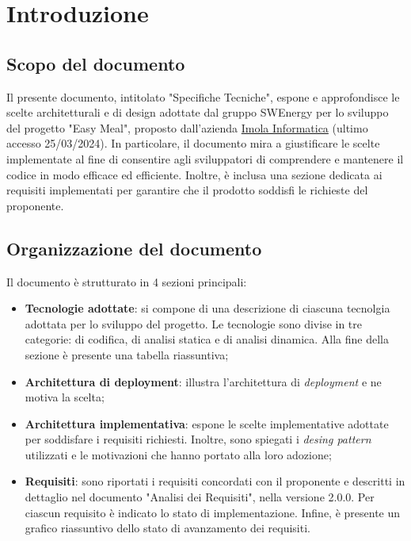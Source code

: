 \section{Introduzione}

\subsection{Scopo del documento}

Il presente documento, intitolato "Specifiche Tecniche", espone e approfondisce
le scelte architetturali e di design adottate dal gruppo SWEnergy per lo
sviluppo del progetto "Easy Meal", proposto dall'azienda \href{https://imolainformatica.it}{Imola Informatica} 
(ultimo accesso 25/03/2024). In particolare, il documento mira a giustificare le
scelte implementate al fine di consentire agli sviluppatori di comprendere e
mantenere il codice in modo efficace ed efficiente. Inoltre, è inclusa una
sezione dedicata ai requisiti implementati per garantire che il prodotto
soddisfi le richieste del proponente.

\subsection{Organizzazione del documento}

Il documento è strutturato in 4 sezioni principali:

\begin{itemize}
	\item \textbf{Tecnologie adottate}: si compone di una descrizione di
	      ciascuna tecnolgia adottata per lo sviluppo del progetto.
	      Le tecnologie sono divise in tre categorie: di codifica,
	      di analisi statica e di analisi dinamica. Alla fine della sezione è
	      presente una tabella riassuntiva;

	\item \textbf{Architettura di deployment}: illustra l'architettura di
	      \textit{deployment} e ne motiva la scelta;

	\item \textbf{Architettura implementativa}: espone le scelte implementative
	      adottate per soddisfare i requisiti richiesti. Inoltre, sono spiegati
	      i \textit{desing pattern} utilizzati e le motivazioni che hanno
	      portato alla loro adozione;

	\item \textbf{Requisiti}: sono riportati i requisiti concordati con il
	      proponente e descritti in dettaglio nel documento "Analisi dei
	      Requisiti", nella versione 2.0.0. Per ciascun requisito è indicato lo
	      stato di implementazione. Infine, è presente un grafico riassuntivo
	      dello stato di avanzamento dei requisiti.
\end{itemize}


